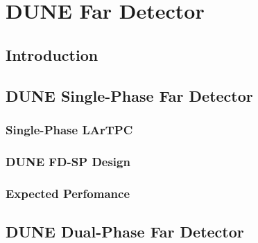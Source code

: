 \chapter{DUNE Far Detector}
\label{ch:exec-summ-fd}


\section{Introduction}
\label{sec:exec-summ-fd-intro}


\section{DUNE Single-Phase Far Detector}
\label{sec:exec-summ-fd-sp}


\subsection{Single-Phase LArTPC}
\label{sec:exec-summ-fd-sp-tpc}


\subsection{DUNE FD-SP Design}
\label{sec:exec-summ-fd-sp-design}


\subsection{Expected Perfomance}
\label{sec:exec-summ-fd-sp-perf}


\section{DUNE Dual-Phase Far Detector}
\label{sec:exec-summ-fd-dp}


